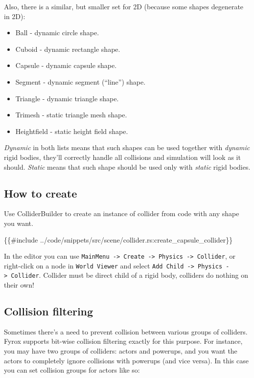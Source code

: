 \documentclass[
]{book}
\newenvironment{Shaded}{\begin{snugshade}}{\end{snugshade}}
\newcommand{\NormalTok}[1]{#1}
\providecommand{\tightlist}{%
  \setlength{\itemsep}{0pt}\setlength{\parskip}{0pt}}
\theoremstyle{definition}
\theoremstyle{definition}
\theoremstyle{definition}
\theoremstyle{definition}
\theoremstyle{remark}
\begin{document}
Also, there is a similar, but smaller set for 2D (because some shapes degenerate in 2D):

\begin{itemize}
\tightlist
\item
  Ball - dynamic circle shape.
\item
  Cuboid - dynamic rectangle shape.
\item
  Capsule - dynamic capsule shape.
\item
  Segment - dynamic segment (``line'') shape.
\item
  Triangle - dynamic triangle shape.
\item
  Trimesh - static triangle mesh shape.
\item
  Heightfield - static height field shape.
\end{itemize}

\emph{Dynamic} in both lists means that such shapes can be used together with \emph{dynamic} rigid bodies, they'll correctly handle
all collisions and simulation will look as it should. \emph{Static} means that such shape should be used only with \emph{static} rigid bodies.

\subsection{How to create}\label{how-to-create-10}

Use ColliderBuilder to create an instance of collider from code with any shape you want.

\begin{Shaded}
\begin{Highlighting}[]
\NormalTok{\{\{\#include ../code/snippets/src/scene/collider.rs:create\_capsule\_collider\}\}}
\end{Highlighting}
\end{Shaded}

In the editor you can use \texttt{MainMenu\ -\textgreater{}\ Create\ -\textgreater{}\ Physics\ -\textgreater{}\ Collider}, or right-click on a node in \texttt{World\ Viewer} and select \texttt{Add\ Child\ -\textgreater{}\ Physics\ -\textgreater{}\ Collider}. Collider must be direct child of a rigid body, colliders do nothing on their own!

\subsection{Collision filtering}\label{collision-filtering}

Sometimes there's a need to prevent collision between various groups of colliders. Fyrox supports bit-wise collision filtering exactly for this purpose. For instance, you may have two groups of colliders: actors and powerups, and you want the actors to completely ignore collisions with powerups (and vice versa). In this case you can set collision groups for actors like so:
\end{document}
